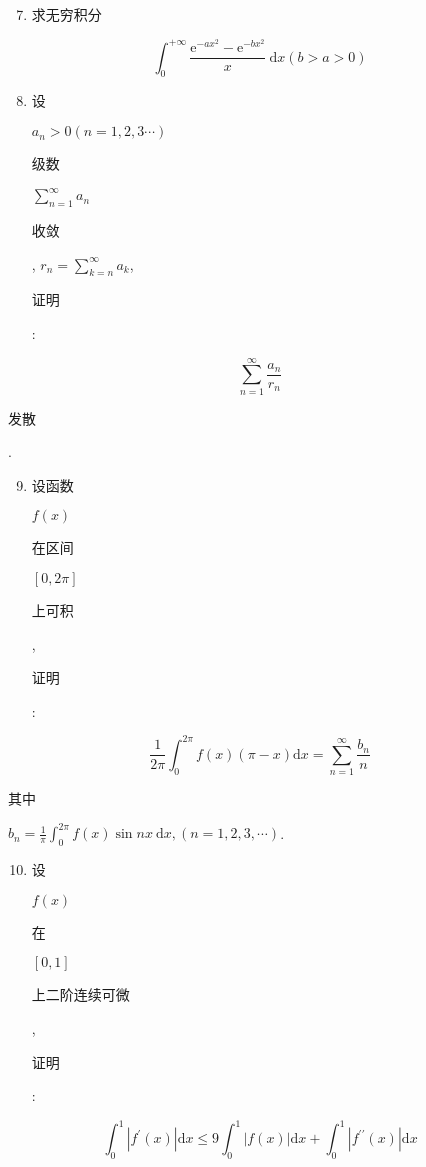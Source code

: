 \documentclass[10pt]{article}
\begin{document}
\begin{enumerate}
  \setcounter{enumi}{6}
  \item \begin{CJK}{UTF8}{mj}求无穷积分\end{CJK}
\end{enumerate}
$$
\int_{0}^{+\infty} \frac{\mathrm{e}^{-a x^{2}}-\mathrm{e}^{-b x^{2}}}{x} \mathrm{~d} x(b>a>0)
$$

\begin{enumerate}
  \setcounter{enumi}{7}
  \item \begin{CJK}{UTF8}{mj}设\end{CJK} $a_{n}>0(n=1,2,3 \cdots)$ \begin{CJK}{UTF8}{mj}级数\end{CJK} $\sum_{n=1}^{\infty} a_{n}$ \begin{CJK}{UTF8}{mj}收敛\end{CJK}, $r_{n}=\sum_{k=n}^{\infty} a_{k}$, \begin{CJK}{UTF8}{mj}证明\end{CJK}:
\end{enumerate}
$$
\sum_{n=1}^{\infty} \frac{a_{n}}{r_{n}}
$$
\begin{CJK}{UTF8}{mj}发散\end{CJK}.

\begin{enumerate}
  \setcounter{enumi}{8}
  \item \begin{CJK}{UTF8}{mj}设函数\end{CJK} $f(x)$ \begin{CJK}{UTF8}{mj}在区间\end{CJK} $[0,2 \pi]$ \begin{CJK}{UTF8}{mj}上可积\end{CJK}, \begin{CJK}{UTF8}{mj}证明\end{CJK}:
\end{enumerate}
$$
\frac{1}{2 \pi} \int_{0}^{2 \pi} f(x)(\pi-x) \mathrm{d} x=\sum_{n=1}^{\infty} \frac{b_{n}}{n}
$$
\begin{CJK}{UTF8}{mj}其中\end{CJK} $b_{n}=\frac{1}{\pi} \int_{0}^{2 \pi} f(x) \sin n x \mathrm{~d} x,(n=1,2,3, \cdots)$.

\begin{enumerate}
  \setcounter{enumi}{9}
  \item \begin{CJK}{UTF8}{mj}设\end{CJK} $f(x)$ \begin{CJK}{UTF8}{mj}在\end{CJK} $[0,1]$ \begin{CJK}{UTF8}{mj}上二阶连续可微\end{CJK}, \begin{CJK}{UTF8}{mj}证明\end{CJK}:
\end{enumerate}
$$
\int_{0}^{1}\left|f^{\prime}(x)\right| \mathrm{d} x \leq 9 \int_{0}^{1}|f(x)| \mathrm{d} x+\int_{0}^{1}\left|f^{\prime \prime}(x)\right| \mathrm{d} x
$$
\end{document}
